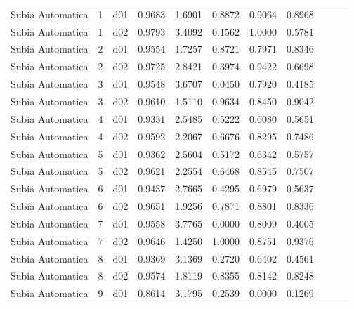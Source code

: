 \begin{landscape}
\begin{longtable}{p{2cm}rrrrrrrrrr}
     Subia Automatica  &          1 &     d01 &   0.9683 &  1.6901 &        0.8872 &           0.9064 &  0.8968 \\
     Subia Automatica  &          1 &     d02 &   0.9793 &  3.4092 &        0.1562 &           1.0000 &  0.5781 \\
     Subia Automatica  &          2 &     d01 &   0.9554 &  1.7257 &        0.8721 &           0.7971 &  0.8346 \\
     Subia Automatica  &          2 &     d02 &   0.9725 &  2.8421 &        0.3974 &           0.9422 &  0.6698 \\
     Subia Automatica  &          3 &     d01 &   0.9548 &  3.6707 &        0.0450 &           0.7920 &  0.4185 \\
     Subia Automatica  &          3 &     d02 &   0.9610 &  1.5110 &        0.9634 &           0.8450 &  0.9042 \\
     Subia Automatica  &          4 &     d01 &   0.9331 &  2.5485 &        0.5222 &           0.6080 &  0.5651 \\
     Subia Automatica  &          4 &     d02 &   0.9592 &  2.2067 &        0.6676 &           0.8295 &  0.7486 \\
     Subia Automatica  &          5 &     d01 &   0.9362 &  2.5604 &        0.5172 &           0.6342 &  0.5757 \\
     Subia Automatica  &          5 &     d02 &   0.9621 &  2.2554 &        0.6468 &           0.8545 &  0.7507 \\
     Subia Automatica  &          6 &     d01 &   0.9437 &  2.7665 &        0.4295 &           0.6979 &  0.5637 \\
     Subia Automatica  &          6 &     d02 &   0.9651 &  1.9256 &        0.7871 &           0.8801 &  0.8336 \\
     Subia Automatica  &          7 &     d01 &   0.9558 &  3.7765 &        0.0000 &           0.8009 &  0.4005 \\
     Subia Automatica  &          7 &     d02 &   0.9646 &  1.4250 &        1.0000 &           0.8751 &  0.9376 \\
     Subia Automatica  &          8 &     d01 &   0.9369 &  3.1369 &        0.2720 &           0.6402 &  0.4561 \\
     Subia Automatica  &          8 &     d02 &   0.9574 &  1.8119 &        0.8355 &           0.8142 &  0.8248 \\
     Subia Automatica  &          9 &     d01 &   0.8614 &  3.1795 &        0.2539 &           0.0000 &  0.1269 \\

\end{longtable}
\end{landscape}
